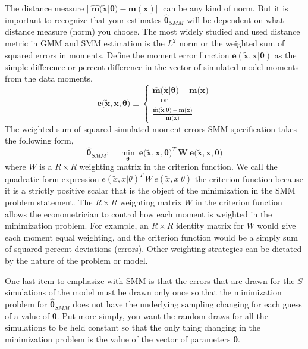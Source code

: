 \documentclass[letterpaper,12pt]{article}
\theoremstyle{definition}
\begin{document}
    The distance measure $||\bm{\hat{m}}(\bm{\tilde{x}}|\bm{\theta})-\bm{m}(\bm{x})||$ can be any kind of norm. But it is important to recognize that your estimates $\bm{\hat{\theta}}_{SMM}$ will be dependent on what distance measure (norm) you choose. The most widely studied and used distance metric in GMM and SMM estimation is the $L^2$ norm or the weighted sum of squared errors in moments. Define the moment error function $\bm{e}(\bm{\tilde{x}},\bm{x}|\bm{\theta})$ as the simple difference or percent difference in the vector of simulated model moments from the data moments.
    \begin{equation}\label{EqSMMerrvec}
      \bm{e}\bigl(\bm{\tilde{x}},\bm{x},\bm{\theta}\bigr)\equiv
        \begin{cases}
          \bm{\hat{m}}\bigl(\bm{\tilde{x}}|\bm{\theta}\bigr) - \bm{m}\bigl(\bm{x}\bigr) \\
          \quad\text{or} \\
          \frac{\bm{\hat{m}}\bigl(\bm{\tilde{x}}|\bm{\theta}\bigr) - \bm{m}\bigl(\bm{x}\bigr)}{\bm{m}\bigl(\bm{x}\bigr)}
        \end{cases}
    \end{equation}
    The weighted sum of squared simulated moment errors SMM specification takes the following form,
    \begin{equation}\label{EqSMMdef}
      \bm{\hat{\theta}}_{SMM}:\quad \min_{\bm{\theta}}\:\bm{e}\bigl(\bm{\tilde{x}},\bm{x},\bm{\theta}\bigr)^T\:\bm{W}\:\bm{e}\bigl(\bm{\tilde{x}},\bm{x},\bm{\theta}\bigr)
    \end{equation}
    where $W$ is a $R\times R$ weighting matrix in the criterion function. We call the quadratic form expression $e(\tilde{x},x|\theta)^T \, W \, e(\tilde{x},x|\theta)$ the criterion function because it is a strictly positive scalar that is the object of the minimization in the SMM problem statement. The $R\times R$ weighting matrix $W$ in the criterion function allows the econometrician to control how each moment is weighted in the minimization problem. For example, an $R\times R$ identity matrix for $W$ would give each moment equal weighting, and the criterion function would be a simply sum of squared percent deviations (errors). Other weighting strategies can be dictated by the nature of the problem or model.

    One last item to emphasize with SMM is that the errors that are drawn for the $S$ simulations of the model must be drawn only once so that the minimization problem for $\bm{\hat{\theta}}_{SMM}$ does not have the underlying sampling changing for each guess of a value of $\bm{\theta}$. Put more simply, you want the random draws for all the simulations to be held constant so that the only thing changing in the minimization problem is the value of the vector of parameters $\bm{\theta}$.
\end{document}
